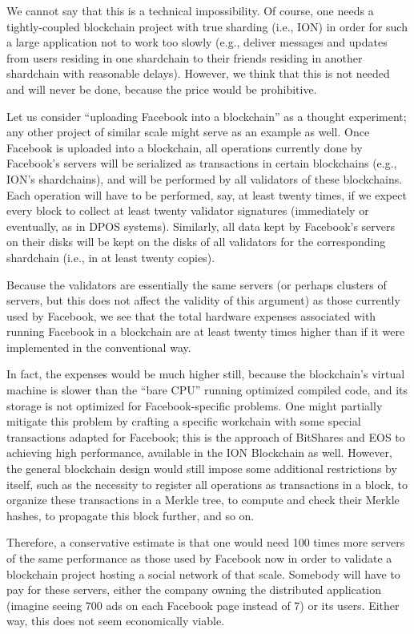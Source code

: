 \documentclass[12pt,oneside]{article}
\begin{document}
We cannot say that this is a technical impossibility. Of course, one
needs a tightly-coupled blockchain project with true sharding (i.e.,
ION) in order for such a large application not to work too slowly
(e.g., deliver messages and updates from users residing in one
shardchain to their friends residing in another shardchain with
reasonable delays). However, we think that this is not needed and will
never be done, because the price would be prohibitive.

Let us consider ``uploading Facebook into a blockchain'' as a thought
experiment; any other project of similar scale might serve as an
example as well. Once Facebook is uploaded into a blockchain, all
operations currently done by Facebook's servers will be serialized as
transactions in certain blockchains (e.g., ION's shardchains), and
will be performed by all validators of these blockchains. Each
operation will have to be performed, say, at least twenty times, if we
expect every block to collect at least twenty validator signatures
(immediately or eventually, as in DPOS systems). Similarly, all data
kept by Facebook's servers on their disks will be kept on the disks of
all validators for the corresponding shardchain (i.e., in at least
twenty copies).

Because the validators are essentially the same servers (or perhaps
clusters of servers, but this does not affect the validity of this
argument) as those currently used by Facebook, we see that the total
hardware expenses associated with running Facebook in a blockchain are
at least twenty times higher than if it were implemented in the
conventional way.

In fact, the expenses would be much higher still, because the
blockchain's virtual machine is slower than the ``bare CPU'' running
optimized compiled code, and its storage is not optimized for
Facebook-specific problems. One might partially mitigate this problem
by crafting a specific workchain with some special transactions
adapted for Facebook; this is the approach of BitShares and EOS to
achieving high performance, available in the ION Blockchain as
well. However, the general blockchain design would still impose some
additional restrictions by itself, such as the necessity to register
all operations as transactions in a block, to organize these
transactions in a Merkle tree, to compute and check their Merkle
hashes, to propagate this block further, and so on.

Therefore, a conservative estimate is that one would need 100 times
more servers of the same performance as those used by Facebook now in
order to validate a blockchain project hosting a social network of
that scale. Somebody will have to pay for these servers, either the
company owning the distributed application (imagine seeing 700 ads on
each Facebook page instead of 7) or its users. Either way, this does
not seem economically viable.
\end{document}
